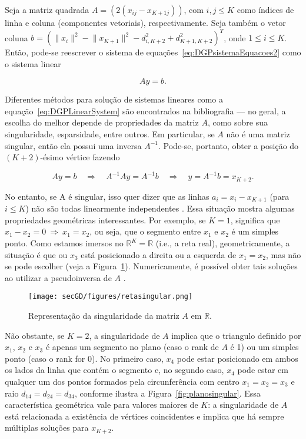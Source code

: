 Seja a matriz quadrada $A = (2(x_{ij} - x_{K+1j}))$, com $i,j \leq K$ como índices de linha e coluna (componentes vetoriais), respectivamente. Seja também o vetor coluna $b = (\lVert x_i\rVert^2 - \lVert x_{K+1}\rVert^2 - d^2_{i,K+2} + d^2_{K+1,K+2})^T$, onde $1 \leq i\leq K$. Então, pode-se reescrever o sistema de equações~\ref{eq:DGPsistemaEquacoes2} como o sistema linear

\begin{equation}
	Ay=b.
	\label{eq:DGPLinearSystem}
\end{equation}

Diferentes métodos para solução de sistemas lineares como a equação~\ref{eq:DGPLinearSystem} são encontrados na bibliografia \cite{AlgebraLinearElon} --- no geral, a escolha do melhor depende de propriedades da matriz $A$, como sobre sua singularidade, esparsidade, entre outros. Em particular, se $A$ não é uma matriz singular, então ela possui uma inversa $A^{-1}$. Pode-se, portanto, obter a posição do $(K+2)$-ésimo vértice fazendo

\begin{equation}
	Ay = b \quad \Rightarrow \quad A^{-1}Ay = A^{-1}b \quad \Rightarrow \quad y = A^{-1}b = x_{K+2}.
\end{equation}

No entanto, se A é singular, isso quer dizer que as linhas $a_i = x_i - x_{K+1}$ (para $i\leq K$) não são todas linearmente independentes \cite{AlgebraLinearElon}. Essa situação mostra algumas propriedades geométricas interessantes. Por exemplo, se $K=1$, significa que $x_1 - x_2 = 0 \ \Rightarrow \  x_1 = x_2$, ou seja, que o segmento entre $x_1$ e $x_2$ é um simples ponto. Como estamos imersos no $\mathbb{R}^{K} = \mathbb{R}$ (i.e., a reta real), geometricamente, a situação é que ou $x_3$ está posicionado a direita ou a esquerda de $x_1 = x_2$, mas não se pode escolher (veja a Figura~\ref{fig:retasingular}). Numericamente, é possível obter tais soluções ao utilizar a pseudoinversa de $A$ \cite{linearAlgebraNumericalTrefethen}.

\begin{figure}[H]
	\begin{center}
		\texttt{[image: secGD/figures/retasingular.png]}
	\end{center}
	\caption{Representação da singularidade da matriz $A$ em $\mathbb{R}$.}
	\label{fig:retasingular}
\end{figure}

Não obstante, se $K = 2$, a singularidade de $A$ implica que o triangulo definido por $x_1$, $x_2$ e $x_3$ é apenas um segmento no plano (caso o rank de $A$ é 1) ou um simples ponto (caso o rank for 0). No primeiro caso, $x_4$ pode estar posicionado em ambos os lados da linha que contém o segmento e, no segundo caso, $x_4$ pode estar em qualquer um dos pontos formados pela circunferência com centro $x_1 = x_2 = x_3$ e raio $d_{14} = d_{24} = d_{34}$, conforme ilustra a Figura~\ref{fig:planosingular}. 
Essa característica geométrica vale para valores maiores de $K$: a singularidade de $A$ está relacionada a existência de vértices coincidentes e implica que há sempre múltiplas soluções para $x_{K+2}$.

